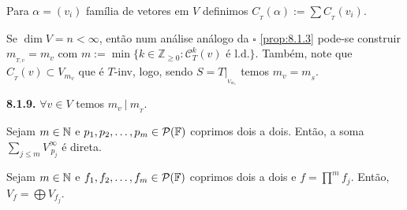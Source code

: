      
\begin{definition}
    Para \(\alpha = (v_i)\) família de vetores em \(V\) definimos \(C_{_T}(\alpha):= \sum C_{_T}(v_i)\).  
\end{definition}


\begin{note}
    Se \(\dim V = n < \infty\), então num análise análogo da \(\square\) \ref{prop:8.1.3} pode-se construir \(m_{_{T,v}}= m_v\) com \(m := \min \{k \in \mathbb{Z}_{\geq 0 }: \mathscr{C}^k_{T}(v)\text{ é l.d.}\}\). Também, note que \(C_{_T}(v)\subset V_{m_v}\) que é \(T\)-inv, logo, sendo \(S = T|_{_{V_{m_v}}}\) temos \(m_v = m_{_S}\). 
\end{note}

\begin{corollary}
    \textbf{8.1.9.} \(\forall v \in V\) temos \(m_v \ | \ m_{_T}\). 
\end{corollary}

\begin{proposition}
    \label{prop:8.1.11}
    Sejam \(m \in \mathbb{N}\) e \(p_1, p_2, \ldots, p_m\in \mathcal{P}(\mathbb{F}) \) coprimos dois a dois. Então, a soma \(\underset{j\leq m}{\sum} V_{\ p_j}^\infty\) é direta.
\end{proposition}


\begin{proposition}
    \label{prop:8.1.12}
    Sejam \(m \in \mathbb{N}\) e \(f_1, f_2, \ldots, f_m \in \mathcal{P}(\mathbb{F})\) coprimos dois a dois e \(f = \prod^m f_j\). Então, \(V_f = \bigoplus V_{f_j}\). 
\end{proposition}

